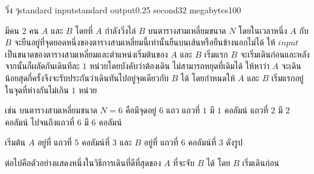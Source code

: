 \documentclass[11pt,a4paper]{article}
\begin{document}
 
\begin{problem}{วิ่ง ๆ}{standard input}{standard output}{0.25 second}{32 megabytes}{100}
 
มีคน $2$ คน $A$ และ $B$ โดยที่ $A$ กำลังวิ่งไล่ $B$ บนตารางสามเหลี่ยมขนาด $N$ โดยในเวลาหนึ่ง $A$ กับ $B$ จะยืนอยู่ที่จุดยอดหนึ่งของตารางสามเหลี่ยมนี้เท่านั้นยืนบนเส้นหรือยืนข้างนอกไม่ได้ ให้ $input$ เป็นขนาดของตารางสามเหลี่ยมและตำแหน่งเริ่มต้นของ $A$ และ $B$ เริ่มแรก $B$ จะเริ่มเดินก่อนและหลังจากนั้นก็ผลัดกันเดินทีละ $1$ หน่วยโดยบังคับว่าต้องเดิน ไม่สามารถหยุดที่เดิมได้ ให้หาว่า $A$ จะเดินน้อยสุดกี่ครั้งจึงจะรับประกันว่าเดินทันไปอยู่จุดเดียวกับ $B$ ได้ โดยกำหนดให้ $A$ และ $B$ เริ่มแรกอยู่ในจุดที่ห่างกันไม่เกิน $1$ หน่วย

เช่น บนตารางสามเหลี่ยมขนาด $N = 6$ คือมีจุดอยู่ $6$ แถว แถวที่ $1$ มี $1$ คอลัมน์ แถวที่ $2$ มี $2$ คอลัมน์ ไปจนถึงแถวที่ $6$ มี $6$ คอลัมน์

เริ่มต้น $A$ อยู่ที่ แถวที่ $5$ คอลัมน์ที่ $3$ และ $B$ อยู่ที่ แถวที่ $6$ คอลัมน์ที่ $3$ ดังรูป

\newcommand*\rows{5}

\begin{center}
\end{center}
ต่อไปคือตัวอย่างแสดงหนึ่งในวิธีการเดินที่ดีที่สุดของ $A$ ที่จะจับ $B$ ได้ โดย $B$ เริ่มเดินก่อน
\begin{center}
\end{center}
\end{problem}
\end{document}
